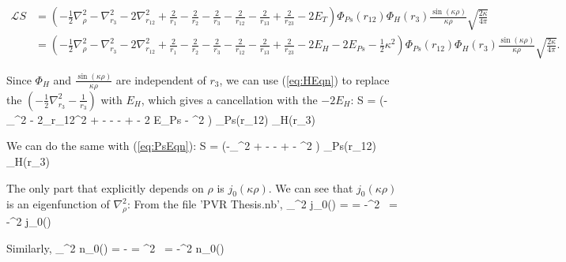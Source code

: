 \documentclass[Dissertation.tex]{subfiles}
\begin{document}
\begin{align}
\nonumber \mathcal{L}S &= \left(-\frac{1}{2}\nabla_\rho^2 - \nabla_{r_3}^2 - 2\nabla_{r_{12}}^2 + \frac{2}{r_1} - \frac{2}{r_2} - \frac{2}{r_3} - \frac{2}{r_{12}} - \frac{2}{r_{13}} + \frac{2}{r_{23}} - 2 E_T\right) \Phi_{Ps}(r_{12}) \Phi_H(r_3) \frac{\sin(\kappa\rho)}{\kappa\rho} \sqrt{\frac{2\kappa}{4\pi}} \\
&= \left(-\frac{1}{2}\nabla_\rho^2 - \nabla_{r_3}^2 - 2\nabla_{r_{12}}^2 + \frac{2}{r_1} - \frac{2}{r_2} - \frac{2}{r_3} - \frac{2}{r_{12}} - \frac{2}{r_{13}} + \frac{2}{r_{23}} - 2 E_H - 2 E_{Ps} - \frac{1}{2}\kappa^2 \right) \Phi_{Ps}(r_{12}) \Phi_H(r_3) \frac{\sin(\kappa\rho)}{\kappa\rho} \sqrt{\frac{2\kappa}{4\pi}}.
\end{align}

Since $\Phi_H$ and $\frac{\sin(\kappa\rho)}{\kappa\rho}$ are independent of $r_3$, we can use (\ref{eq:HEqn}) to replace the $\left(-\frac{1}{2}\nabla_{r_3}^2 - \frac{1}{r_3}\right)$ with $E_H$, which gives a cancellation with the $-2 E_H$:
\beq
{}S = \left(-\nabla_\rho^2 - 2\nabla_{r_{12}}^2 +  -  -  -  +  - 2 E_{Ps} - \kappa^2 \right) \Phi_{Ps}(r_{12}) \Phi_H(r_3) \frac{\sin(\kappa\rho)}{\kappa\rho} \sqrt{\frac{2\kappa}{4\pi}}
\eeq

\noindent We can do the same with (\ref{eq:PsEqn}):
\beq
{}S = \left(-\nabla_\rho^2 +  -  -  +  - \kappa^2 \right) \Phi_{Ps}(r_{12}) \Phi_H(r_3) \frac{\sin(\kappa\rho)}{\kappa\rho} \sqrt{\frac{2\kappa}{4\pi}}
\label{LS1}
\eeq

The only part that explicitly depends on $\rho$ is $j_0(\kappa\rho)$.  We can see that $j_0(\kappa\rho)$ is an eigenfunction of $\nabla_\rho^2$:
From the file 'PVR Thesis.nb',
\beq
\nabla_\rho^2 \: j_0(\kappa\rho) =  \frac{\partial}{\partial\rho} \left[ \rho^2 \frac{\partial}{\partial\rho} \left( \frac{\sin(\kappa\rho)}{\kappa\rho} \right)\right] = -\kappa^2 \, \frac{\sin(\kappa\rho)}{\kappa\rho} = -\kappa^2 j_0(\kappa\rho)
\label{eigenj0}
\eeq

\noindent Similarly,
\beq
\nabla_\rho^2 \: n_0(\kappa\rho) = - \frac{\partial}{\partial\rho} \left[ \rho^2 \frac{\partial}{\partial\rho} \left( \frac{\cos(\kappa\rho)}{\kappa\rho} \right)\right] = \kappa^2 \, \frac{\cos(\kappa\rho)}{\kappa\rho} = -\kappa^2 n_0(\kappa\rho)
\label{eigenn0}
\eeq
\end{document}
